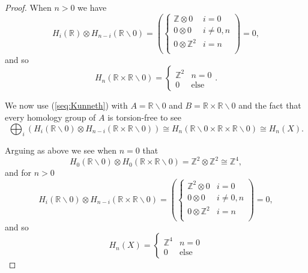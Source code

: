 \documentclass{article}
\begin{document}
\begin{enumerate}
\begin{proof}
		When $n>0$ we have 
		\[ H_i(\mathbb{R}) \otimes H_{n-i}(\mathbb{R}\backslash 0) = \left (\begin{cases} 
			\mathbb{Z} \otimes 0 & i=0\\  
			0 \otimes 0 & i \neq 0,n\\
			0 \otimes \mathbb{Z}^2 & i = n\\
			\end{cases} \right) = 0 ,\]
		and so
		\[H_{n}( \mathbb{R} \times \mathbb{R}\backslash 0) = \begin{cases} \mathbb{Z}^2 & n=0 \\ 0 &\text{else} \end{cases}.\]
		
		We now use (\ref{seq:Kunneth}) with $A = \mathbb{R} \backslash 0$ and $B = \mathbb{R} \times \mathbb{R} \backslash 0$ and the fact that every homology group of $A$ is torsion-free to see
		\[ \bigoplus_i \left ( H_i(\mathbb{R} \backslash 0) \otimes H_{n-i}(\mathbb{R} \times \mathbb{R}\backslash 0) \right ) \cong H_n(\mathbb{R} \backslash 0 \times\mathbb{R}\times \mathbb{R}\backslash 0) \cong H_n(X).\]
		
		Arguing as above we see when $n=0$ that
		\[ H_0(\mathbb{R} \backslash 0) \otimes H_0(\mathbb{R} \times \mathbb{R}\backslash 0) = \mathbb{Z}^2 \otimes \mathbb{Z}^2 \cong \mathbb{Z}^4,\]
		and 
		for $n >0$ 
		\[ H_i(\mathbb{R} \backslash 0 ) \otimes H_{n-i}(\mathbb{R} \times \mathbb{R}\backslash 0) = \left (\begin{cases} 
			\mathbb{Z}^2 \otimes 0 & i=0\\  
			0 \otimes 0 & i \neq 0,n\\
			0 \otimes \mathbb{Z}^2 & i = n\\
			\end{cases} \right) = 0 ,\]
		and so 
		\[ H_n(X) = \begin{cases} \mathbb{Z}^4 & n=0 \\ 0 & \text{else} \end{cases}\]
	\end{proof}
	
\end{enumerate}
\end{document}

